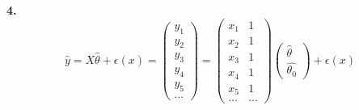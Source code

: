 \documentclass[12pt]{article}
\begin{document}
\begin{minipage}[t]{0.45\textwidth}
         \textbf{4.}
         \[
            \hat{y} = X \hat{\theta} + \epsilon(x)= \begin{pmatrix}
               y_1 \\
               y_2 \\
               y_3 \\
               y_4 \\
               y_5 \\
               \ldots
            \end{pmatrix} = \begin{pmatrix}
            x_1 & 1 \\
            x_2 & 1 \\
            x_3 & 1 \\
            x_4 & 1 \\
            x_5 & 1 \\
            \ldots & \ldots
            \end{pmatrix}   \begin{pmatrix}
            \hat{\theta} \\
            \hat{\theta_0}
         \end{pmatrix} + \epsilon(x)
         \] 
   \end{minipage}
      \hfill
\end{document}
